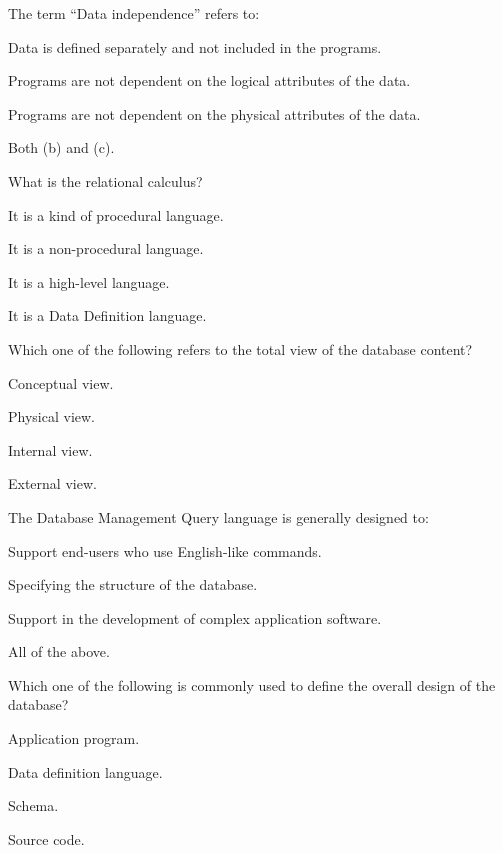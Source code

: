\documentclass[11pt,a4paper]{article}
\begin{document}
\begin{parts}
  \item The term ``Data independence'' refers to:
  \begin{parts}
    \item Data is defined separately and not included in the programs.
    \item Programs are not dependent on the logical attributes of the data.
    \item Programs are not dependent on the physical attributes of the data.
    \item Both (b) and (c).
  \end{parts}

  \item What is the relational calculus?
  \begin{parts}
    \item It is a kind of procedural language.
    \item It is a non-procedural language.
    \item It is a high-level language.
    \item It is a Data Definition language.
  \end{parts}

  \item Which one of the following refers to the total view of the database content?
  \begin{parts}
    \item Conceptual view.
    \item Physical view.
    \item Internal view.
    \item External view.
  \end{parts}

  \item The Database Management Query language is generally designed to:
  \begin{parts}
    \item Support end-users who use English-like commands.
    \item Specifying the structure of the database.
    \item Support in the development of complex application software.
    \item All of the above.
  \end{parts}

  \item Which one of the following is commonly used to define the overall design of the database?
  \begin{parts}
    \item Application program.
    \item Data definition language.
    \item Schema.
    \item Source code.
  \end{parts}


\end{parts}
\end{document}

